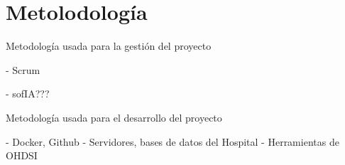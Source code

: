 \chapter{Metolodología}\label{cap:04metodologia}

Metodología usada para la gestión del proyecto

- Scrum

- sofIA???

Metodología usada para el desarrollo del proyecto

- Docker, Github
- Servidores, bases de datos del Hospital
- Herramientas de OHDSI

